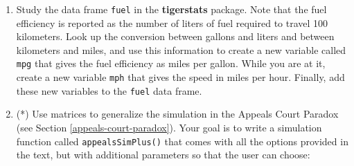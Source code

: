 \documentclass[]{book}
\makeatletter
\newenvironment{Shaded}{\begin{snugshade}}{\end{snugshade}}
\newcommand{\KeywordTok}[1]{\textcolor[rgb]{0.13,0.29,0.53}{\textbf{#1}}}
\newcommand{\DataTypeTok}[1]{\textcolor[rgb]{0.13,0.29,0.53}{#1}}
\newcommand{\StringTok}[1]{\textcolor[rgb]{0.31,0.60,0.02}{#1}}
\newcommand{\NormalTok}[1]{#1}
\newenvironment{kframe}{%
\medskip{}
\setlength{\fboxsep}{.8em}
 \def\at@end@of@kframe{}%
 \ifinner\ifhmode%
  \def\at@end@of@kframe{\end{minipage}}%
  \begin{minipage}{\columnwidth}%
 \fi\fi%
 \def\FrameCommand##1{\hskip\@totalleftmargin \hskip-\fboxsep
 \colorbox{shadecolor}{##1}\hskip-\fboxsep
     \hskip-\linewidth \hskip-\@totalleftmargin \hskip\columnwidth}%
 \MakeFramed {\advance\hsize-\width
   \@totalleftmargin\z@ \linewidth\hsize
   \@setminipage}}%
 {\par\unskip\endMakeFramed%
 \at@end@of@kframe}
\renewenvironment{Shaded}{\begin{kframe}}{\end{kframe}}
\theoremstyle{definition}
\theoremstyle{definition}
\theoremstyle{definition}
\theoremstyle{remark}
\makeatother
\begin{document}
{\begin{enumerate}
\begin{verbatim}
##  lowerLetters           height          sex    
##  Length:100         Min.   :60.63   female:46  
##  Class :character   1st Qu.:64.14   male  :54  
##  Mode  :character   Median :68.56              
##                     Mean   :68.06              
##                     3rd Qu.:71.91              
##                     Max.   :74.58
\end{verbatim}

  \textbf{Hint}: If you have a vector of three letters, such as

\begin{Shaded}
\begin{Highlighting}[]
\NormalTok{vec <-}\StringTok{ }\KeywordTok{c}\NormalTok{(}\StringTok{"g"}\NormalTok{, }\StringTok{"a"}\NormalTok{, }\StringTok{"r"}\NormalTok{)}
\end{Highlighting}
\end{Shaded}

  then you can paste them together as follows:

\begin{Shaded}
\begin{Highlighting}[]
\KeywordTok{paste0}\NormalTok{(vec, }\DataTypeTok{collapse =} \StringTok{""}\NormalTok{)}
\end{Highlighting}
\end{Shaded}

\begin{verbatim}
## [1] "gar"
\end{verbatim}
\item
  Study the data frame \texttt{fuel} in the \textbf{tigerstats} package.
  Note that the fuel efficiency is reported as the number of liters of
  fuel required to travel 100 kilometers. Look up the conversion between
  gallons and liters and between kilometers and miles, and use this
  information to create a new variable called \texttt{mpg} that gives
  the fuel efficiency as miles per gallon. While you are at it, create a
  new variable \texttt{mph} that gives the speed in miles per hour.
  Finally, add these new variables to the \texttt{fuel} data frame.
\item
  (*) Use matrices to generalize the simulation in the Appeals Court
  Paradox (see Section \ref{appeals-court-paradox}). Your goal is to
  write a simulation function called \texttt{appealsSimPlus()} that
  comes with all the options provided in the text, but with additional
  parameters so that the user can choose:


\end{enumerate}}
\end{document}
